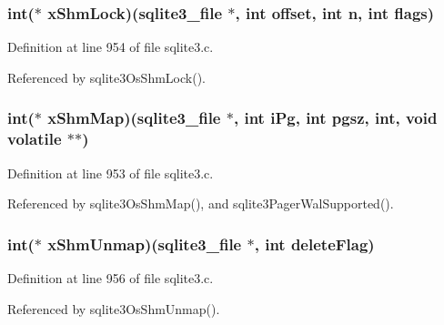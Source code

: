 \subsubsection[{x\+Shm\+Lock}]{\setlength{\rightskip}{0pt plus 5cm}int($\ast$ x\+Shm\+Lock)({\bf sqlite3\+\_\+file} $\ast$, int offset, int n, int flags)}\label{structsqlite3__io__methods_a5e9791b765f3aa8408609e2e1dfd72ff}


Definition at line 954 of file sqlite3.\+c.



Referenced by sqlite3\+Os\+Shm\+Lock().

\hypertarget{structsqlite3__io__methods_a4a778f17a45f083829497b3b73109b9c}{}
\subsubsection[{x\+Shm\+Map}]{\setlength{\rightskip}{0pt plus 5cm}int($\ast$ x\+Shm\+Map)({\bf sqlite3\+\_\+file} $\ast$, int i\+Pg, int pgsz, int, void volatile $\ast$$\ast$)}\label{structsqlite3__io__methods_a4a778f17a45f083829497b3b73109b9c}


Definition at line 953 of file sqlite3.\+c.



Referenced by sqlite3\+Os\+Shm\+Map(), and sqlite3\+Pager\+Wal\+Supported().

\hypertarget{structsqlite3__io__methods_a41473897455cc3cd850549aee3bcd172}{}
\subsubsection[{x\+Shm\+Unmap}]{\setlength{\rightskip}{0pt plus 5cm}int($\ast$ x\+Shm\+Unmap)({\bf sqlite3\+\_\+file} $\ast$, int delete\+Flag)}\label{structsqlite3__io__methods_a41473897455cc3cd850549aee3bcd172}


Definition at line 956 of file sqlite3.\+c.



Referenced by sqlite3\+Os\+Shm\+Unmap().

\hypertarget{structsqlite3__io__methods_a66cbb6be226b7c7a09d2f3c43a9f95b5}{}
